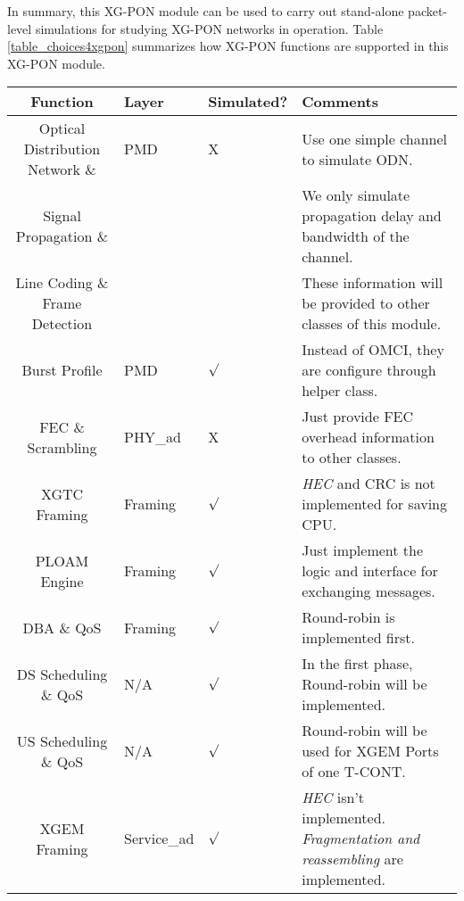 In summary, this XG-PON module can be used to carry out
stand-alone packet-level simulations for studying XG-PON networks
in operation. Table \ref{table_choices4xgpon} summarizes how XG-PON functions 
are supported in this XG-PON module.



\begin{table}[!htbp]
\begin{center}


\begin{tabular}{|c||l|l|l|}\hline
{\bf Function} & {\bf Layer} & {\bf Simulated?} & {\bf Comments} \\ \hline \hline

Optical Distribution Network \& & PMD & {\color{red} X} & Use one simple channel to simulate ODN. \\
Signal Propagation \& &  & & We only simulate propagation delay and bandwidth of the channel.\\
Line Coding \& Frame Detection & & & These information will be provided to other classes of this module.\\
\hline

Burst Profile & PMD & {\color{blue} $\surd$} &  Instead of OMCI, they are configure through helper class. \\
\hline

FEC \& Scrambling &  PHY\_ad & {\color{red} X} & Just provide FEC overhead information to other classes.\\
\hline

XGTC Framing & Framing & {\color{blue} $\surd$} & \emph{HEC} and CRC is not implemented for saving CPU.\\
\hline

PLOAM Engine & Framing & {$\surd$} & Just implement the logic and interface for exchanging messages. \\
\hline


DBA \& QoS & Framing & {\color{blue} $\surd$} & Round-robin is implemented first.  \\
\hline

DS Scheduling \& QoS & N/A & {\color{blue} $\surd$} & In the first phase, Round-robin will be implemented.\\
\hline

US Scheduling \& QoS & N/A & {\color{blue} $\surd$} & Round-robin will be used for XGEM Ports of one T-CONT.\\
\hline

XGEM Framing & Service\_ad & {\color{blue} $\surd$} & \emph{HEC} isn't implemented. \emph{Fragmentation and reassembling} are implemented. \\
\hline


\end{tabular}
\end{center}
\end{table}
